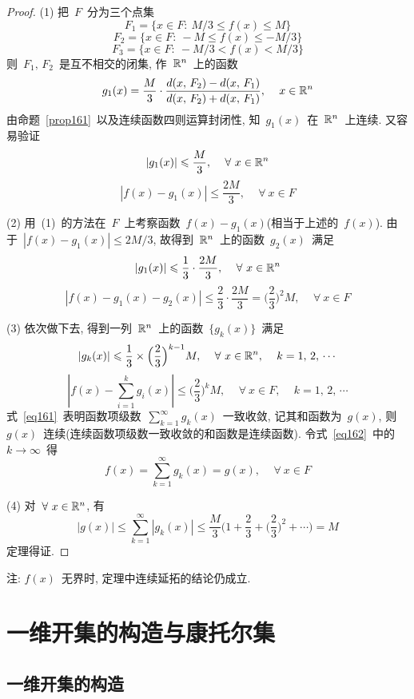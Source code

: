 \begin{proof}
(1) 把~$F$~分为三个点集
\[
F_1 = \{x \in F: \: M/3 \leqslant f(x) \leqslant M\}
\]
\[
F_2 = \{x \in F: \: -M \leqslant f(x) \leqslant -M/3\}
\]
\[
F_3 = \{x \in F: \: -M/3 < f(x) < M/3\}
\]
则~$F_1, \,F_2$~是互不相交的闭集, 作~$\mathbb{R}^n$~上的函数
\[
g_1(x) = \frac{M}{3} \cdot \frac{d(x,\,F_2) - d(x,\,F_1)}{d(x,\,F_2) + d(x,\,F_1)}, \, \quad x \in \mathbb{R}^n
\]
由命题~\ref{prop161}~以及连续函数四则运算封闭性, 知~$g_1(x)$~在~$\mathbb{R}^n$~上连续.
又容易验证
\[
|g_1(x)| \leqslant \frac{M}{3}, \, \quad \forall~x \in \mathbb{R}^n
\]
\[
|f(x) - g_1(x)| \leqslant \frac{2M}{3}, \, \quad \forall~x \in F
\]

(2) 用~(1)~的方法在~$F$~上考察函数~$f(x) - g_1(x)$(相当于上述的~$f(x)$). 由于~$|f(x) - g_1(x)| \leqslant 2M/3$, 故得到~$\mathbb{R}^n$~上的函数~$g_2(x)$~满足
\[
|g_1(x)| \leqslant \frac{1}{3} \cdot \frac{2M}{3}, \, \quad \forall~x \in \mathbb{R}^n
\]
\[
|f(x) - g_1(x) - g_2(x)| \leqslant \frac{2}{3} \cdot \frac{2M}{3} = \Big(\frac{2}{3}\Big)^2 M, \, \quad \forall~x \in F
\]

(3) 依次做下去, 得到一列~$\mathbb{R}^n$~上的函数~$\{g_k(x)\}$~满足
\begin{equation} \label{eq161}
|g_k(x)| \leqslant \frac{1}{3} \times \Big(\frac{2}{3}\Big)^{k-1} M, \, \quad \forall~x \in \mathbb{R}^n, \, \quad k = 1,\,2,\, \cdots
\end{equation}
\begin{equation} \label{eq162}
|f(x) - \sum_{i=1}^k g_i(x)| \leqslant \Big(\frac{2}{3}\Big)^k M, \, \quad \forall~x \in F, \, \quad k = 1,\,2,\, \cdots
\end{equation}
式~\eqref{eq161}~表明函数项级数~$\sum\limits_{k=1}^\infty g_k(x)$~一致收敛, 记其和函数为~$g(x)$,  则~$g(x)$~连续(连续函数项级数一致收敛的和函数是连续函数). 令式~\eqref{eq162}~中的~$k \to \infty$~得
\[
f(x) = \sum_{k=1}^\infty g_k(x) = g(x), \, \quad \forall~x \in F
\]

(4) 对~$\forall~x \in \mathbb{R}^n$, 有
\[
|g(x)| \leqslant \sum_{k=1}^\infty |g_k(x)| \leqslant \frac{M}{3} \Big( 1 + \frac{2}{3} + \Big(\frac{2}{3}\Big)^2 + \cdots \Big) = M
\]
定理得证.
\end{proof}

注: $f(x)$~无界时, 定理中连续延拓的结论仍成立.


\section{一维开集的构造与康托尔集}

\subsection{一维开集的构造}


